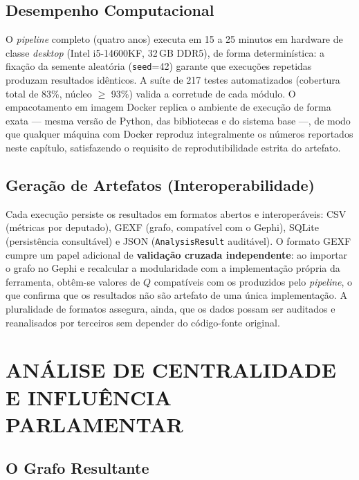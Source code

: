\documentclass[
      12pt,
      a4paper,
      openright,
      oneside,
      chapter=TITLE,
      section=TITLE,
      english,
      french,
      spanish,
      brazilian
    ]{abntex2}
\begin{document}
    \subsection{Desempenho Computacional}
    
    O \textit{pipeline} completo (quatro anos) executa em 15 a 25 minutos em hardware de classe \textit{desktop} (Intel i5-14600KF, 32\,GB DDR5), de forma determinística: a fixação da semente aleatória (\texttt{seed}=42) garante que execuções repetidas produzam resultados idênticos. A suíte de 217 testes automatizados (cobertura total de 83\%, núcleo $\geq$ 93\%) valida a corretude de cada módulo. O empacotamento em imagem Docker replica o ambiente de execução de forma exata --- mesma versão de Python, das bibliotecas e do sistema base ---, de modo que qualquer máquina com Docker reproduz integralmente os números reportados neste capítulo, satisfazendo o requisito de reprodutibilidade estrita do artefato.
    
    \subsection{Geração de Artefatos (Interoperabilidade)}
    
    Cada execução persiste os resultados em formatos abertos e interoperáveis: CSV (métricas por deputado), GEXF (grafo, compatível com o Gephi), SQLite (persistência consultável) e JSON (\texttt{AnalysisResult} auditável). O formato GEXF cumpre um papel adicional de \textbf{validação cruzada independente}: ao importar o grafo no Gephi e recalcular a modularidade com a implementação própria da ferramenta, obtêm-se valores de $Q$ compatíveis com os produzidos pelo \textit{pipeline}, o que confirma que os resultados não são artefato de uma única implementação. A pluralidade de formatos assegura, ainda, que os dados possam ser auditados e reanalisados por terceiros sem depender do código-fonte original.
    
    \section{ANÁLISE DE CENTRALIDADE E INFLUÊNCIA PARLAMENTAR}
    
    \subsection{O Grafo Resultante}
    
\end{document}
